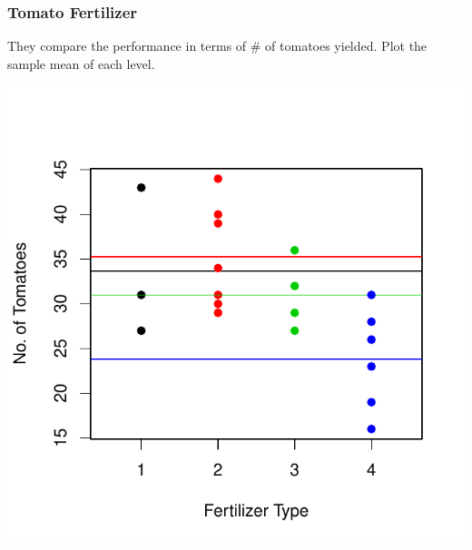\documentclass[handout]{beamer}
\begin{document}
\addtocounter{framenumber}{-1}
\begin{frame}
\frametitle{Tomato Fertilizer}
They compare the performance in terms of \# of tomatoes yielded. Plot the sample mean of each level. \textcolor{white}{Question:  are the mean tomato yields different?} 
\begin{center}
\includegraphics{figure/lec22-004}
\end{center}
\end{frame}
\end{document}
